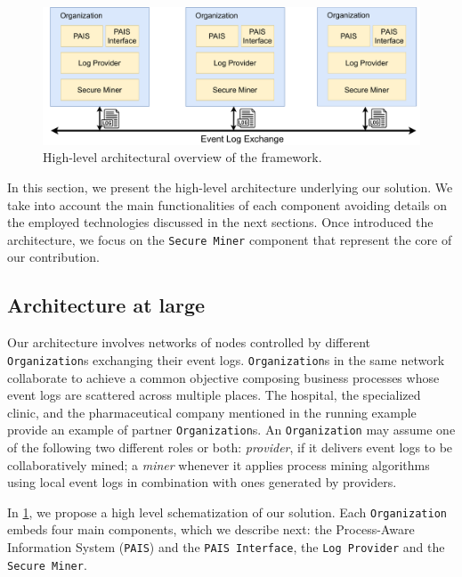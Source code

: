 \begin{figure}[t]
\centering
\includegraphics[width=13cm]{content/figures/architecture_diagram.pdf}
\caption{High-level architectural overview of the framework.}
\label{fig:architecture_diagram}
\end{figure}
In this section, we present the high-level architecture underlying our solution. We take into account the main functionalities of each component avoiding details on the employed technologies discussed in the next sections. Once introduced the architecture, we focus on the \texttt{Secure Miner} component that represent the core of our contribution.

\subsection{Architecture at large}
Our architecture involves networks of nodes controlled by different \texttt{Organization}s exchanging their event logs. \texttt{Organization}s in the same network collaborate to achieve a common objective composing business processes whose event logs are scattered across multiple places. The hospital, the specialized clinic, and the pharmaceutical company mentioned in the running example provide an example of partner \texttt{Organization}s. An \texttt{Organization} may assume one of the following two different roles or both: \textit{provider}, if it delivers event logs to be collaboratively mined; a \textit{miner} whenever it applies process mining algorithms using local event logs in combination with ones generated by providers. %

In \cref{fig:architecture_diagram}, we propose a high level schematization of our solution. Each \texttt{Organization} embeds four main components, which we describe next: the Process-Aware Information System (\texttt{PAIS}) and the \texttt{PAIS Interface}, the \texttt{Log Provider} and the \texttt{Secure Miner}.


